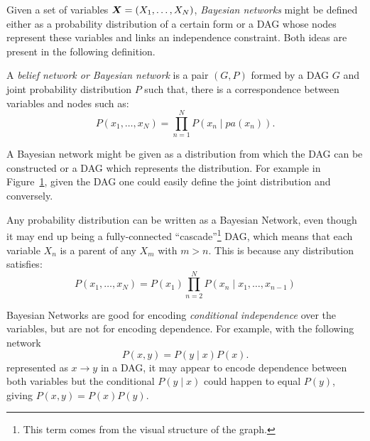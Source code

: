 
Given a set of variables \(\bm{X} = (X_{1},\dots,X_{N})\), \emph{Bayesian networks} might be defined either as a probability distribution of a certain form or a DAG whose nodes represent these variables and links an independence constraint. Both ideas are present in the following definition.

\begin{definition}
  A \emph{belief network or Bayesian network} is a pair \((G,P)\) formed by a DAG \(G\) and  joint probability distribution \(P\) such that, there is a correspondence between variables and nodes such as:
  \[
    P(x_{1},\dots,x_{N}) = \prod_{n=1}^{N}P(x_{n}\mid pa(x_{n})).
  \]
\end{definition}

\begin{remark}
  A Bayesian network might be given as a distribution from which the DAG can be constructed or a DAG which represents the distribution. For example in Figure~\ref{fig:bn_example}, given the DAG one could easily define the joint distribution and conversely.
\end{remark}

\begin{figure}[h!]
  \centering
    \label{fig:bn_example}
\end{figure}

Any probability distribution can be written as a Bayesian Network, even though
it may end up being a fully-connected ``cascade''\footnote{This term comes from the visual structure of the graph.} DAG, which means that each variable \( X_n \) is a parent of any \( X_m \) with \( m > n \). This is because any distribution satisfies:
\[
   P(x_1, \dots, x_{N}) = P(x_1) \prod_{n=2}^{N}P(x_{n} \mid x_{1},\dots, x_{n-1})
 \]

Bayesian Networks are good for encoding \emph{conditional independence} over the
variables, but are not for encoding dependence. For example, with the following
network
\[
P(x,y) = P(y\mid x)P(x).
\]
represented as \(x \to y\) in a DAG, it may appear to encode dependence between both variables but the conditional \(P(y\mid x)\) could happen to equal \(P(y)\), giving \(P(x,y) = P(x)P(y)\).

